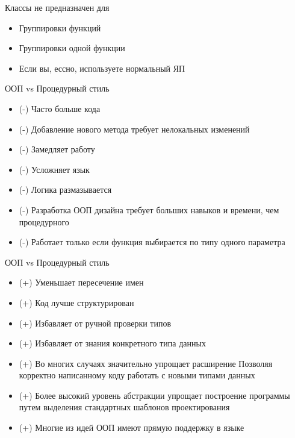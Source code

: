 \documentclass{article}
\begin{document}
\begin{center} Классы не предназначен для \end{center}
\begin{itemize}
    \item Группировки функций
    \item Группировки одной функции
    \item Если вы, ессно, используете нормальный ЯП
\end{itemize}
\newpage

\begin{center} ООП vs Процедурный стиль \end{center}
\begin{itemize}
    \item (-) Часто больше кода
    \item (-) Добавление нового метода требует нелокальных изменений
    \item (-) Замедляет работу
    \item (-) Усложняет язык
    \item (-) Логика размазывается
    \item (-) Разработка ООП дизайна требует больших навыков и времени, чем процедурного
    \item (-) Работает только если функция выбирается по типу одного параметра
\end{itemize}
\newpage

\begin{center} ООП vs Процедурный стиль \end{center}
\begin{itemize}
    \item (+) Уменьшает пересечение имен
    \item (+) Код лучше структурирован
    \item (+) Избавляет от ручной проверки типов
    \item (+) Избавляет от знания конкретного типа данных
    \item (+) Во многих случаях значительно упрощает расширение
              Позволяя корректно написанному коду работать с новыми типами данных
    \item (+) Более высокий уровень абстракции упрощает построение программы
              путем выделения стандартных шаблонов проектирования
    \item (+) Многие из идей ООП имеют прямую поддержку в языке
\end{itemize}
\newpage
\end{document}
